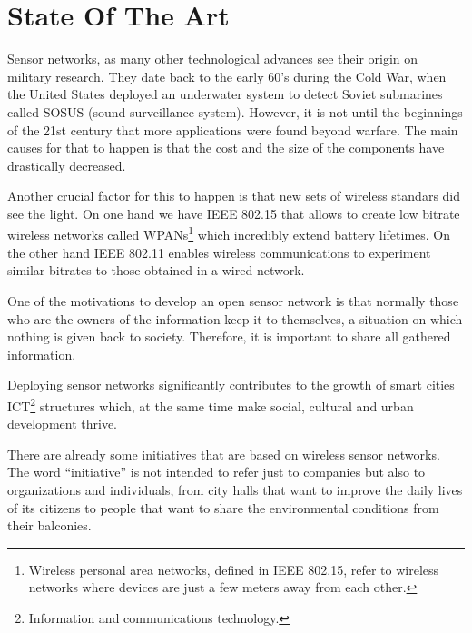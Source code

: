 \chapter{State Of The Art} %

\label{Chapter2} %



Sensor networks, as many other technological advances see their origin on military research. They date back to the early 60's during the Cold War, when the United States deployed an underwater system to detect Soviet submarines called SOSUS (sound surveillance system). However, it is not until the beginnings of the 21st century that more applications were found beyond warfare. The main causes for that to happen is that the cost and the size of the components have drastically decreased.

Another crucial factor for this to happen is that new sets of wireless standars did see the light. On one hand we have IEEE 802.15 that allows to create low bitrate wireless networks called WPANs\footnote{Wireless personal area networks, defined in IEEE 802.15, refer to wireless networks where devices are just a few meters away from each other.} which incredibly extend battery lifetimes. On the other hand IEEE 802.11 enables wireless communications to experiment similar bitrates to those obtained in a wired network.

One of the motivations to develop an open sensor network is that normally those who are the owners of the information keep it to themselves, a situation on which nothing is given back to society. Therefore, it is important to share all gathered information.

Deploying sensor networks significantly contributes to the growth of smart cities ICT\footnote{Information and communications technology.} structures which, at the same time make social, cultural and urban development thrive\citep{caragliu2009smart}\citep{hollands2008will}.

There are already some initiatives that are based on wireless sensor networks. The word ``initiative'' is not intended to refer just to companies but also to organizations and individuals, from city halls that want to improve the daily lives of its citizens to people that want to share the environmental conditions from their balconies.

